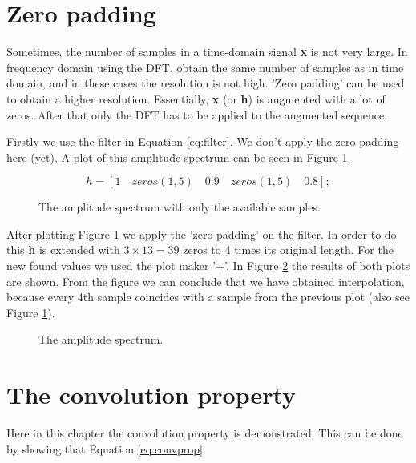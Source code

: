 \documentclass[final]{scrreprt} %
\begin{document}
\section{Zero padding}
Sometimes, the number of samples in a time-domain signal \textbf{x} is not very large. 
In frequency domain using the DFT, obtain the same number of samples as in time domain, and in these cases the resolution is not high.
'Zero padding' can be used to obtain a higher resolution.
Essentially, \textbf{x} (or \textbf{h}) is augmented with a lot of zeros.
After that only the DFT has to be applied to the augmented sequence. 

Firstly we use the filter in Equation \ref{eq:filter}. 
We don't apply the zero padding here (yet). 
A plot of this amplitude spectrum can be seen in Figure \ref{fig:zeropadding1}.

\begin{equation}
h = [1\quad zeros(1,5)\quad 0.9\quad zeros(1,5)\quad 0.8];
\label{eq:filter}
\end{equation}

\begin{figure}[H]
	\centering
	\setlength\figureheight{6cm}
  	\setlength\figurewidth{10cm}
	
	\caption{The amplitude spectrum with only the available samples.}
	\label{fig:zeropadding1}
\end{figure}

After plotting Figure \ref{fig:zeropadding1} we apply the 'zero padding' on the filter. 
In order to do this \textbf{h} is extended with $3\times 13 = 39$ zeros to 4 times its original length.
For the new found values we used the plot maker '+'.
In Figure \ref{fig:zeropadding2} the results of both plots are shown. 
From the figure we can conclude that we have obtained interpolation, because every 4th sample coincides with a sample from the previous plot (also see Figure \ref{fig:zeropadding1}).

\begin{figure}[H]
	\centering
	\setlength\figureheight{6cm}
  	\setlength\figurewidth{10cm}
	
	\caption{The amplitude spectrum.}
	\label{fig:zeropadding2}
\end{figure}


\section{The convolution property}
Here in this chapter the convolution property is demonstrated. 
This can be done by showing that Equation \ref{eq:convprop}
\end{document}
